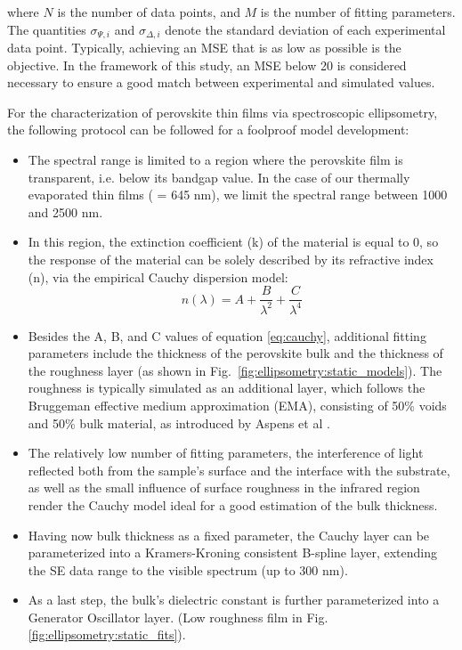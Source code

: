 where \( N \) is the number of data points, and \( M \) is the number of fitting parameters. The quantities \( \sigma_{\Psi,i} \) and \( \sigma_{\Delta,i} \) denote the standard deviation of each experimental data point. Typically, achieving an MSE that is as low as possible is the objective. In the framework of this study, an MSE below 20 is considered necessary to ensure a good match between experimental and simulated values. 


For the characterization of perovskite thin films via spectroscopic ellipsometry, the following protocol can be followed for a foolproof model development: 
\begin{itemize}
    \item The spectral range is limited to a region where the perovskite film is transparent, i.e. below its bandgap value. In the case of our thermally evaporated  thin films ( = 645 nm), we limit the spectral range between 1000 and 2500 nm. 
    \item In this region, the extinction coefficient (k) of the material is equal to 0, so the response of the material can be solely described by its refractive index (n), via the empirical Cauchy dispersion model:
        \begin{equation}
            n(\lambda) = A + \frac{B}{\lambda^2} + \frac{C}{\lambda^4}
            \label{eq:cauchy}
        \end{equation}
    \item Besides the A, B, and C values of equation \ref{eq:cauchy}, additional fitting parameters include the thickness of the perovskite bulk and the thickness of the roughness layer (as shown in Fig.~\ref{fig:ellipsometry:static_models}). The roughness is typically simulated as an additional layer, which follows the Bruggeman effective medium approximation (EMA), consisting of 50\% voids and 50\% bulk material, as introduced by Aspens et al \cite{Aspnes1979InvestigationEllipsometry}. 

    \item The relatively low number of fitting parameters, the interference of light reflected both from the sample's surface and the interface with the substrate, as well as the small influence of surface roughness in the infrared region render the Cauchy model ideal for a good estimation of the bulk thickness. 

    \item Having now bulk thickness as a fixed parameter, the Cauchy layer can be parameterized into a Kramers-Kroning consistent B-spline layer, extending the SE data range to the visible spectrum (up to 300 nm). 

    \item As a last step, the bulk's dielectric constant is further parameterized into a Generator Oscillator layer. (Low roughness film in Fig.\ref{fig:ellipsometry:static_fits}).    

\end{itemize}

